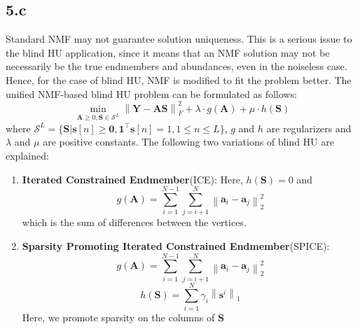 \documentclass[12pt]{article}
\newcommand{\norm}[1]{\left\lVert #1 \right\rVert}
\begin{document}
\subsection*{5.c}
Standard NMF may not guarantee solution uniqueness. This is a serious issue to the blind HU application, since it means that an NMF solution may not be necessarily be the true endmembers and abundances, even in the noiseless case. Hence, for the case of blind HU, NMF is modified to fit the problem better. The unified NMF-based blind HU problem can be formulated as follows:
$$\min \limits_{\boldsymbol{A} \geq 0, \boldsymbol{S} \in \mathcal{S}^L}\norm{\boldsymbol{Y} - \boldsymbol{A} \boldsymbol{S}}_F^2 + \lambda \cdot g(\boldsymbol{A}) + \mu \cdot h(\boldsymbol{S})$$
where $\mathcal{S}^L = \{\boldsymbol{S} | \boldsymbol{s}[n] \geq \boldsymbol{0}, \boldsymbol{1}^\intercal \boldsymbol{s}[n] = 1, 1 \leq n \leq L\}$, $g$ and $h$ are regularizers and $\lambda$ and $\mu$ are positive constants. The following two variations of blind HU are explained:
\begin{enumerate}
	\item \textbf{Iterated Constrained Endmember}(ICE):\newline
	Here, $h(\boldsymbol{S}) = 0$ and 
	$$g(\boldsymbol{A}) = \sum \limits_{i=1}^{N-1}\sum \limits_{j=i+1}^N \norm{\boldsymbol{a}_i - \boldsymbol{a}_j}_2^2$$
	which is the sum of differences between the vertices.
	\item \textbf{Sparsity Promoting Iterated Constrained Endmember}(SPICE):\newline
	$$g(\boldsymbol{A}) = \sum \limits_{i=1}^{N-1}\sum \limits_{j=i+1}^N \norm{\boldsymbol{a}_i - \boldsymbol{a}_j}_2^2$$
	$$h(\boldsymbol{S}) = \sum \limits_{i=1}^N \gamma_i \norm{\boldsymbol{s}^i}_1$$
	Here, we promote sparsity on the columns of $\boldsymbol{S}$
\end{enumerate}
\end{document}
